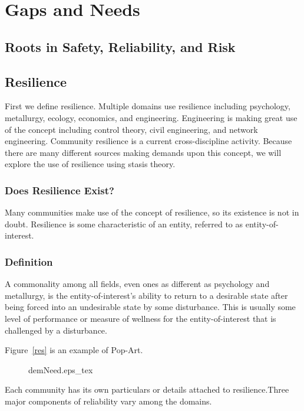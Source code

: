 
\renewcommand{\thechapter}{2}

\chapter{Gaps and Needs}

\section{Roots in Safety, Reliability, and Risk}

\section{Resilience}
First we define resilience. Multiple domains use resilience including
psychology, metallurgy, ecology, economics, and
engineering. Engineering is making great use of the concept including
control theory, civil engineering, and network engineering. Community
resilience is a current cross-discipline activity. Because there are
many different sources making demands upon this concept, we will
explore the use of resilience using stasis theory.

\subsection{Does Resilience Exist?}

Many communities make use of the concept of resilience, so its
existence is not in doubt. Resilience is some characteristic of an
entity, referred to as entity-of-interest. 

\subsection{Definition}

A commonality among all fields, even ones as different as
psychology and metallurgy, is the entity-of-interest's ability to
return to a desirable state after being forced into an undesirable
state by some disturbance. This is usually some level of performance
or measure of wellness for the entity-of-interest that is challenged
by a disturbance.

Figure~\ref{res} is an example of Pop-Art.
\begin{figure} 
  \centering
  \def\svgwidth{70mm}
  {demNeed.eps_tex}
\end{figure}
Each community has its own particulars or details attached to
resilience.Three major components of reliability vary among the domains. 

